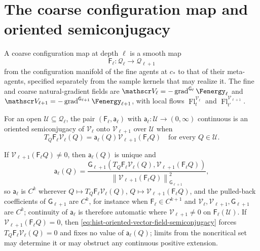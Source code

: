 \section{The coarse configuration map and oriented semiconjugacy}
\label{sec:hist-configuration-coarse-map}
\label{sec:hist-independent-flows}

A coarse configuration map at depth $\ell$ is a smooth map
\begin{equation}
\mathsf F_\ell:\mathcal Q_\ell\longrightarrow\mathcal Q_{\ell+1}
\label{eq:hist-configuration-coarse-map}
\end{equation}
from the configuration manifold of the fine agents at $c_*$ to that of their meta-agents,
specified separately from the sample kernels that may realize it.  The fine and coarse
natural-gradient fields are
$\mathscr V_\ell=-\operatorname{grad}^{\mathsf G_\ell}\Fenergy_\ell$ and
$\mathscr V_{\ell+1}=-\operatorname{grad}^{\mathsf G_{\ell+1}}\Fenergy_{\ell+1}$, with
local flows $\operatorname{Fl}^{\mathscr V_\ell}_t$ and
$\operatorname{Fl}^{\mathscr V_{\ell+1}}_{t'}$.

For an open $\mathcal U\subseteq\mathcal Q_\ell$, the pair $(\mathsf F_\ell,\mathsf
a_\ell)$ with $\mathsf a_\ell:\mathcal U\to(0,\infty)$ continuous is an oriented
semiconjugacy of $\mathscr V_\ell$ onto $\mathscr V_{\ell+1}$ over $\mathcal U$ when
\begin{equation}
T_Q\mathsf F_\ell \mathscr V_\ell(Q)
=\mathsf a_\ell(Q) \mathscr V_{\ell+1}(\mathsf F_\ell Q)
\quad\text{for every }Q\in\mathcal U.
\label{eq:hist-oriented-vector-field-semiconjugacy}
\end{equation}

If $\mathscr V_{\ell+1}(\mathsf F_\ell Q)\ne0$, then $\mathsf a_\ell(Q)$ is unique and
\begin{equation}
\mathsf a_\ell(Q)
=\frac{\mathsf G_{\ell+1}
\left(T_Q\mathsf F_\ell \mathscr V_\ell(Q),\mathscr V_{\ell+1}(\mathsf F_\ell Q)\right)}
{\left\lVert\mathscr V_{\ell+1}(\mathsf F_\ell Q)\right\rVert^2_{\mathsf G_{\ell+1}}},
\label{eq:hist-semiconjugacy-factor-formula}
\end{equation}
so $\mathsf a_\ell$ is $C^k$ wherever $Q\mapsto T_Q\mathsf F_\ell\mathscr V_\ell(Q)$,
$Q\mapsto\mathscr V_{\ell+1}(\mathsf F_\ell Q)$, and the pulled-back coefficients of
$\mathsf G_{\ell+1}$ are $C^k$, for instance when $\mathsf F_\ell\in C^{k+1}$ and
$\mathscr V_\ell,\mathscr V_{\ell+1},\mathsf G_{\ell+1}$ are $C^k$; continuity of
$\mathsf a_\ell$ is therefore automatic where $\mathscr V_{\ell+1}\ne0$ on
$\mathsf F_\ell(\mathcal U)$.  If $\mathscr V_{\ell+1}(\mathsf F_\ell Q)=0$, then
\eqref{eq:hist-oriented-vector-field-semiconjugacy} forces
$T_Q\mathsf F_\ell\mathscr V_\ell(Q)=0$ and fixes no value of $\mathsf a_\ell(Q)$; limits
from the noncritical set may determine it or may obstruct any continuous positive
extension.  

